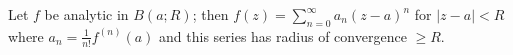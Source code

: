 Let $f$ be analytic in $B(a; R)$; then $f(z) = \sum_{n=0}^{\infty} a_n(z-a)^n$ for $|z-a| < R$ where $a_n = \frac{1}{n!} f^{(n)}(a)$ and this series has radius of convergence $\geq R$.